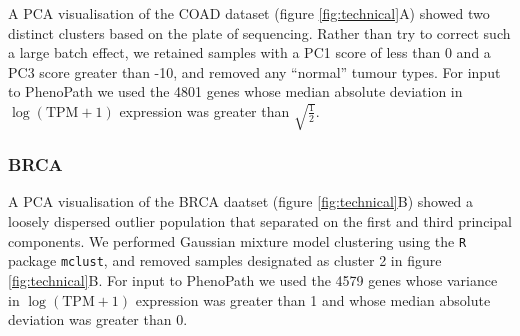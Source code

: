 A PCA visualisation of the COAD dataset (figure \ref{fig:technical}A) showed two distinct clusters based on the plate of sequencing. Rather than try to correct such a large batch effect, we retained samples with a PC1 score of less than 0 and a PC3 score greater than -10, and removed any ``normal'' tumour types. For input to PhenoPath we used the 4801 genes whose median absolute deviation in $\log(\text{TPM} + 1)$ expression was greater than $\sqrt{\frac{1}{2}}$.

\subsubsection{BRCA}

A PCA visualisation of the BRCA daatset (figure \ref{fig:technical}B) showed a loosely dispersed outlier population that separated on the first and third principal components. We performed Gaussian mixture model clustering using the \texttt{R} package \texttt{mclust}\cite{Fraley_undated-ug}, and removed samples designated as cluster 2 in figure \ref{fig:technical}B. For input to PhenoPath we used the 4579 genes whose variance in $\log(\text{TPM} + 1)$ expression was greater than 1 and whose median absolute deviation was greater than 0.
